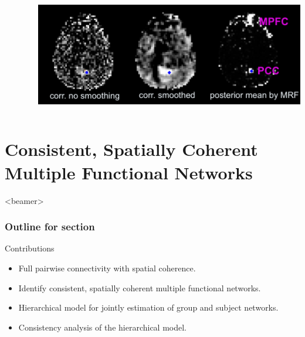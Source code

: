\documentclass[sansserif, 10pt]{beamer}
\begin{document}
\begin{frame}
\begin{columns}
\begin{column}{0.4\textwidth}
    \end{column}
    \begin{column}{0.6\textwidth}
       {
        \includegraphics[width=1.0\textwidth]{sfig/m1_real}
      }
    \end{column}
  \end{columns}
\end{frame}

\section{Consistent, Spatially Coherent Multiple Functional Networks}

\begin{frame}<beamer>
  \frametitle{Outline for section \thesection}
  \tableofcontents[currentsection, sectionstyle=show/hide, subsectionstyle=show/show/hide]

  \begin{block}{Contributions}
    \begin{itemize}
    \item Full pairwise connectivity with spatial coherence.
    \item \alert{Identify consistent, spatially coherent multiple functional networks.}
    \item Hierarchical model for jointly estimation of group and subject networks.
    \item Consistency analysis of the hierarchical model.
    \end{itemize}
  \end{block}

\end{frame}
\end{document}
